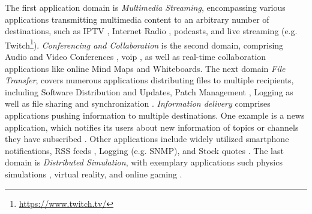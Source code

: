 The first application domain is \textit{Multimedia Streaming}, encompassing 
    various applications transmitting multimedia content to an arbitrary number
    of destinations, such as IPTV \cite{meadcast2, ratnasamy2006revisiting},
    Internet Radio \cite{meadcast1}, podcasts, and live streaming (e.g.
    Twitch\footnote{\url{https://www.twitch.tv/}}).
\textit{Conferencing and Collaboration} is the second domain, comprising Audio
    and Video Conferences \cite{overlay_mc_routing, meadcast2,
    mc_routing_multimedia}, \gls{voip} \cite{gxcast, xcast_rfc}, as well as
    real-time collaboration applications \cite{diot2000deployment, xcast_rfc}
    like online Mind Maps and Whiteboards.
The next domain \textit{File Transfer}, covers numerous applications 
    distributing files to multiple recipients, including Software Distribution
    and Updates, Patch Management \cite{meadcast1, ratnasamy2006revisiting}, 
    Logging \cite{diot2000deployment} as well as file sharing and
    synchronization \cite{overlay_mc_routing}.
\textit{Information delivery} comprises applications pushing information to 
    multiple destinations.
One example is a news application, which notifies its users about new
    information of topics or channels they have subscribed
    \cite{diot2000deployment}.
Other applications include widely utilized smartphone notifications, RSS feeds
    \cite{ratnasamy2006revisiting}, Logging (e.g. SNMP), and Stock quotes
    \cite{cisco_ipmc}.
The last domain is \textit{Distributed Simulation}, with exemplary applications
    such physics simulations \cite{diot2000deployment}, virtual reality, and
    online gaming \cite{ratnasamy2006revisiting}.

